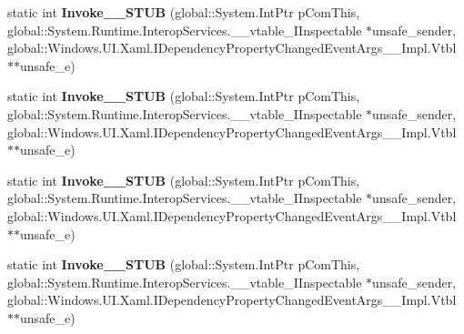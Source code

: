\begin{DoxyCompactItemize}
\item 
\mbox{\label{struct_windows_1_1_u_i_1_1_xaml_1_1_dependency_property_changed_event_handler_____impl_1_1_vtbl_a81bd48ea1dee25b56d32cf0a180fc74c}} 
static int {\bfseries Invoke\+\_\+\+\_\+\+S\+T\+UB} (global\+::\+System.\+Int\+Ptr p\+Com\+This, global\+::\+System.\+Runtime.\+Interop\+Services.\+\_\+\+\_\+vtable\+\_\+\+I\+Inspectable $\ast$unsafe\+\_\+sender, global\+::\+Windows.\+U\+I.\+Xaml.\+I\+Dependency\+Property\+Changed\+Event\+Args\+\_\+\+\_\+\+Impl.\+Vtbl $\ast$$\ast$unsafe\+\_\+e)
\item 
\mbox{\label{struct_windows_1_1_u_i_1_1_xaml_1_1_dependency_property_changed_event_handler_____impl_1_1_vtbl_a81bd48ea1dee25b56d32cf0a180fc74c}} 
static int {\bfseries Invoke\+\_\+\+\_\+\+S\+T\+UB} (global\+::\+System.\+Int\+Ptr p\+Com\+This, global\+::\+System.\+Runtime.\+Interop\+Services.\+\_\+\+\_\+vtable\+\_\+\+I\+Inspectable $\ast$unsafe\+\_\+sender, global\+::\+Windows.\+U\+I.\+Xaml.\+I\+Dependency\+Property\+Changed\+Event\+Args\+\_\+\+\_\+\+Impl.\+Vtbl $\ast$$\ast$unsafe\+\_\+e)
\item 
\mbox{\label{struct_windows_1_1_u_i_1_1_xaml_1_1_dependency_property_changed_event_handler_____impl_1_1_vtbl_a81bd48ea1dee25b56d32cf0a180fc74c}} 
static int {\bfseries Invoke\+\_\+\+\_\+\+S\+T\+UB} (global\+::\+System.\+Int\+Ptr p\+Com\+This, global\+::\+System.\+Runtime.\+Interop\+Services.\+\_\+\+\_\+vtable\+\_\+\+I\+Inspectable $\ast$unsafe\+\_\+sender, global\+::\+Windows.\+U\+I.\+Xaml.\+I\+Dependency\+Property\+Changed\+Event\+Args\+\_\+\+\_\+\+Impl.\+Vtbl $\ast$$\ast$unsafe\+\_\+e)
\item 
\mbox{\label{struct_windows_1_1_u_i_1_1_xaml_1_1_dependency_property_changed_event_handler_____impl_1_1_vtbl_a81bd48ea1dee25b56d32cf0a180fc74c}} 
static int {\bfseries Invoke\+\_\+\+\_\+\+S\+T\+UB} (global\+::\+System.\+Int\+Ptr p\+Com\+This, global\+::\+System.\+Runtime.\+Interop\+Services.\+\_\+\+\_\+vtable\+\_\+\+I\+Inspectable $\ast$unsafe\+\_\+sender, global\+::\+Windows.\+U\+I.\+Xaml.\+I\+Dependency\+Property\+Changed\+Event\+Args\+\_\+\+\_\+\+Impl.\+Vtbl $\ast$$\ast$unsafe\+\_\+e)

\end{DoxyCompactItemize}
